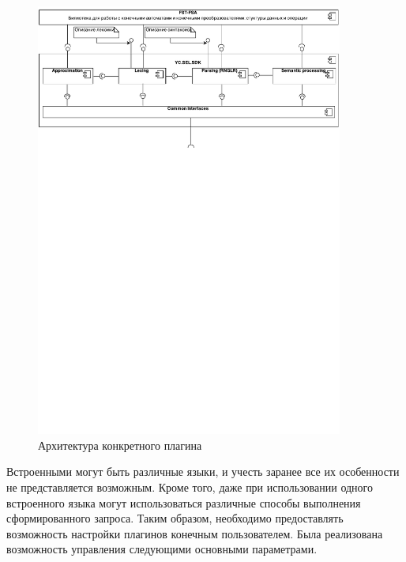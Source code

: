 \begin{figure}[h!]
\begin{center}
\includegraphics[width=0.9\textwidth]{pics/Components}
\caption{Архитектура конкретного плагина}
\label{fig:ReSharperPluginArch} 
\end{center}
\end{figure}

Встроенными могут быть различные языки, и учесть заранее все их особенности не представляется возможным. Кроме того, даже при использовании одного встроенного языка могут использоваться различные способы выполнения сформированного запроса. Таким образом, необходимо предоставлять возможность настройки плагинов конечным пользователем. Была реализована возможность управления следующими основными параметрами. 

